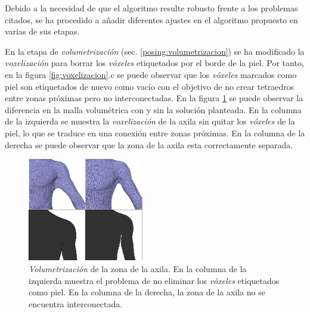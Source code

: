 Debido a la necesidad de que el algoritmo resulte robusto frente a los problemas citados, se ha procedido a añadir diferentes ajustes en el algoritmo propuesto en varias de sus etapas.

En la etapa de \emph{volumetrización} (sec. \ref{posing:volumetrizacion}) se ha modificado la \emph{voxelización} para borrar los \emph{vóxeles} etiquetados por el borde de la piel. Por tanto, en la figura \ref{fig:voxelizacion}.c se puede observar que los \emph{vóxeles} marcados como piel son etiquetados de nuevo como vacío con el objetivo de no crear tetraedros entre zonas próximas pero no interconectadas. En la figura \ref{fig:volsol} se puede observar la diferencia en la malla volumétrica con y sin la solución planteada. En la columna de la izquierda se muestra la \emph{voxelización} de la axila sin quitar los \emph{vóxeles} de la piel, lo que se traduce en una conexión entre zonas próximas. En la columna de la derecha se puede observar que la zona de la axila esta correctamente separada.

\begin{figure}[h]
   \centering
    \includegraphics[width=0.45\textwidth]{IMG/volumetrizacion2.png}
    \caption{
    \emph{Volumetrización} de la zona de la axila. En la columna de la izquierda muestra el problema de no eliminar los \emph{vóxeles} etiquetados como piel. En la columna de la derecha, la zona de la axila no se encuentra interconectada.}
\label{fig:volsol}
\end{figure}


